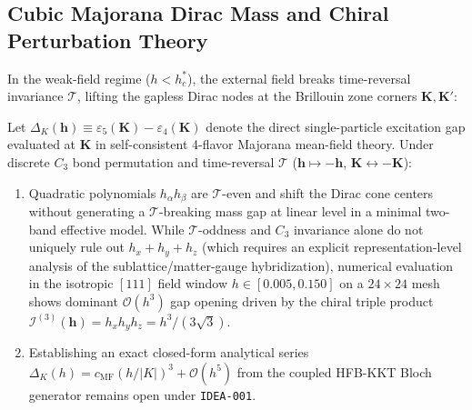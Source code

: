 \subsection{Cubic Majorana Dirac Mass and Chiral Perturbation Theory}
In the weak-field regime ($h < h_c^*$), the external field breaks time-reversal invariance $\mathcal{T}$, lifting the gapless Dirac nodes at the Brillouin zone corners $\mathbf{K}, \mathbf{K}'$:

\begin{proposition}
\label{thm:cubic_gap_law}
Let $\Delta_K(\mathbf{h}) \equiv \varepsilon_5(\mathbf{K}) - \varepsilon_4(\mathbf{K})$ denote the direct single-particle excitation gap evaluated at $\mathbf{K}$ in self-consistent 4-flavor Majorana mean-field theory. Under discrete $C_3$ bond permutation and time-reversal $\mathcal{T}$ ($\mathbf{h} \mapsto -\mathbf{h}$, $\mathbf{K} \leftrightarrow -\mathbf{K}$):
\begin{enumerate}
\item Quadratic polynomials $h_\alpha h_\beta$ are $\mathcal{T}$-even and shift the Dirac cone centers without generating a $\mathcal{T}$-breaking mass gap at linear level in a minimal two-band effective model. While $\mathcal{T}$-oddness and $C_3$ invariance alone do not uniquely rule out $h_x + h_y + h_z$ (which requires an explicit representation-level analysis of the sublattice/matter-gauge hybridization), numerical evaluation in the isotropic $[111]$ field window $h \in [0.005, 0.150]$ on a $24\times 24$ mesh shows dominant $\mathcal{O}(h^3)$ gap opening driven by the chiral triple product $\mathcal{I}^{(3)}(\mathbf{h}) = h_x h_y h_z = h^3/(3\sqrt{3})$.
\item Establishing an exact closed-form analytical series $\Delta_K(h) = c_{\mathrm{MF}}(h/|K|)^3 + \mathcal{O}(h^5)$ from the coupled HFB-KKT Bloch generator remains open under \texttt{IDEA-001}.
\end{enumerate}
\end{proposition}

